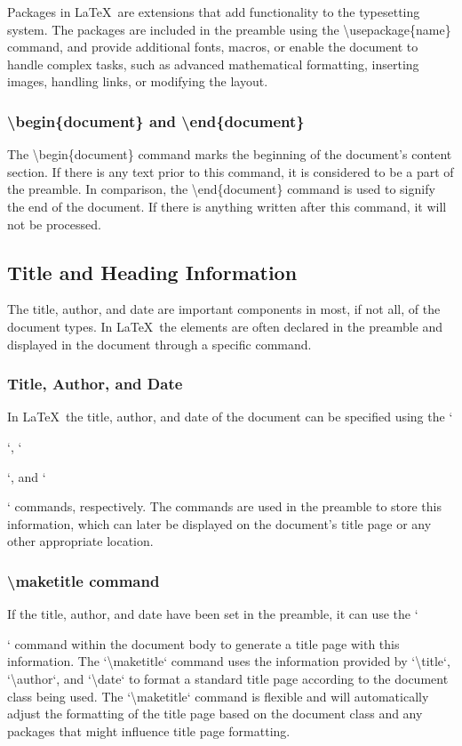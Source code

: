 \documentclass[12pt,journal,compsoc]{IEEEtran}
\begin{document}
Packages in \LaTeX\ are extensions that add functionality to the typesetting system. The packages are included in the preamble using the \textbackslash usepackage\{name\} command, and provide additional fonts, macros, or enable the document to handle complex tasks, such as advanced mathematical formatting, inserting images, handling links, or modifying the layout. 

\subsubsection{\textbackslash begin\{document\} and \textbackslash end\{document\}}

The \textbackslash begin\{document\} command marks the beginning of the document's content section. If there is any text prior to this command, it is considered to be a part of the preamble.  In comparison, the \textbackslash end\{document\} command is used to signify the end of the document. If there is anything written after this command, it will not be processed.

\subsection{Title and Heading Information}

The title, author, and date are important components in most, if not all, of the document types. In \LaTeX\, the elements are often declared in the preamble and displayed in the document through a specific command.

\subsubsection{Title, Author, and Date}

In \LaTeX\, the title, author, and date of the document can be specified using the `\title{}`, `\author{}`, and `\date{}` commands, respectively. The commands are used in the preamble to store this information, which can later be displayed on the document's title page or any other appropriate location. 

\subsubsection{\textbackslash maketitle command}

If the title, author, and date have been set in the preamble, it can use the `\maketitle` command within the document body to generate a title page with this information. The `\textbackslash{}maketitle` command uses the information provided by `\textbackslash{}title`, `\textbackslash{}author`, and `\textbackslash{}date` to format a standard title page according to the document class being used. The `\textbackslash{}maketitle` command is flexible and will automatically adjust the formatting of the title page based on the document class and any packages that might influence title page formatting. 
\end{document}

